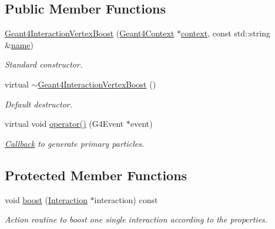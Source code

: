 \subsection*{Public Member Functions}
\begin{DoxyCompactItemize}
\item 
\hyperlink{class_d_d4hep_1_1_simulation_1_1_geant4_interaction_vertex_boost_a244dd1d7ef8eee7b9ee8a40a09a1963d}{Geant4\+Interaction\+Vertex\+Boost} (\hyperlink{class_d_d4hep_1_1_simulation_1_1_geant4_context}{Geant4\+Context} $\ast$\hyperlink{class_d_d4hep_1_1_simulation_1_1_geant4_action_aa9d87f0ec2a72b7fc2591b18f98d75cf}{context}, const std\+::string \&\hyperlink{class_d_d4hep_1_1_simulation_1_1_geant4_action_af374e70b014d16afb81dd9d77cc3894b}{name})
\begin{DoxyCompactList}\small\item\em Standard constructor. \end{DoxyCompactList}\item 
virtual \hyperlink{class_d_d4hep_1_1_simulation_1_1_geant4_interaction_vertex_boost_a06fa61bb33bf2286f1abb7b0af507b77}{$\sim$\+Geant4\+Interaction\+Vertex\+Boost} ()
\begin{DoxyCompactList}\small\item\em Default destructor. \end{DoxyCompactList}\item 
virtual void \hyperlink{class_d_d4hep_1_1_simulation_1_1_geant4_interaction_vertex_boost_ab66ab43b06523e720a1e377ecd065a66}{operator()} (G4\+Event $\ast$event)
\begin{DoxyCompactList}\small\item\em \hyperlink{class_d_d4hep_1_1_callback}{Callback} to generate primary particles. \end{DoxyCompactList}\end{DoxyCompactItemize}
\subsection*{Protected Member Functions}
\begin{DoxyCompactItemize}
\item 
void \hyperlink{class_d_d4hep_1_1_simulation_1_1_geant4_interaction_vertex_boost_a2d38ef5a3c1e5a4377a1881ae50c7ddc}{boost} (\hyperlink{class_d_d4hep_1_1_simulation_1_1_geant4_interaction_vertex_boost_a24539ccb7908e132acaf99eeec5111e5}{Interaction} $\ast$interaction) const
\begin{DoxyCompactList}\small\item\em Action routine to boost one single interaction according to the properties. \end{DoxyCompactList}\end{DoxyCompactItemize}

